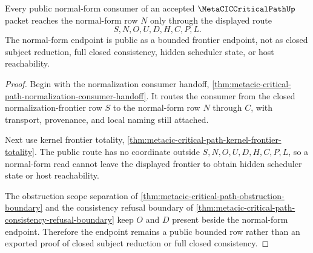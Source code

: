 \begin{theorem}
\label{thm:metacic-critical-path-normal-form-public-nonescape}
Every public normal-form consumer of an accepted $\MetaCICCriticalPathUp$ packet reaches the normal-form row $N$ only through the displayed route
$$
S,N,O,U,D,H,C,P,L.
$$
The normal-form endpoint is public as a bounded frontier endpoint, not as closed subject reduction, full closed consistency, hidden scheduler state, or host reachability.
\end{theorem}
\begin{proof}
Begin with the normalization consumer handoff, \autoref{thm:metacic-critical-path-normalization-consumer-handoff}. It routes the consumer from the closed normalization-frontier row $S$ to the normal-form row $N$ through $C$, with transport, provenance, and local naming still attached.

Next use kernel frontier totality, \autoref{thm:metacic-critical-path-kernel-frontier-totality}. The public route has no coordinate outside $S,N,O,U,D,H,C,P,L$, so a normal-form read cannot leave the displayed frontier to obtain hidden scheduler state or host reachability.

The obstruction scope separation of \autoref{thm:metacic-critical-path-obstruction-boundary} and the consistency refusal boundary of \autoref{thm:metacic-critical-path-consistency-refusal-boundary} keep $O$ and $D$ present beside the normal-form endpoint. Therefore the endpoint remains a public bounded row rather than an exported proof of closed subject reduction or full closed consistency.
\end{proof}

